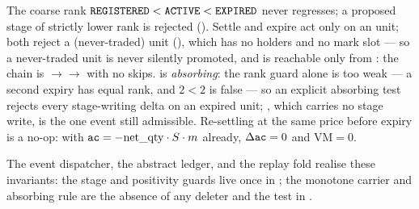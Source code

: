 \begin{invariant}
The coarse rank $\texttt{REGISTERED}<\texttt{ACTIVE}<\texttt{EXPIRED}$ never regresses; a proposed stage of
strictly lower rank is rejected (). Settle and expire act only on an
 unit; both reject a  (never-traded) unit (), which has
no holders and no mark slot --- so a never-traded unit is never silently promoted, and 
is reachable only from : the chain is
$\to$$\to$ with no skips.  is
\emph{absorbing}: the rank guard alone is too weak --- a second expiry has equal rank, and $2<2$ is
false --- so an explicit absorbing test rejects every stage-writing delta on an expired unit;
, which carries no stage write, is the one event still admissible. Re-settling at the same
price before expiry is a no-op: with $\texttt{ac}=-\mathrm{net\_qty}\cdot S\cdot m$ already, $\Delta\texttt{ac}=0$ and
$\mathrm{VM}=0$.
\end{invariant}

The event dispatcher, the abstract ledger, and the replay fold realise these invariants: the stage and
positivity guards live once in ; the monotone carrier and absorbing rule are the absence
of any deleter and the  test in .

